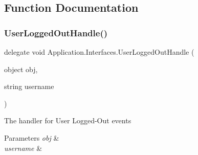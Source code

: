 \subsection{Function Documentation}
\mbox{\label{namespace_application_1_1_interfaces_a3ba96a057acca29f3e2e533aeb2f30e0}} 
\subsubsection{\texorpdfstring{User\+Logged\+Out\+Handle()}{UserLoggedOutHandle()}}
{\footnotesize\ttfamily delegate void Application.\+Interfaces.\+User\+Logged\+Out\+Handle (\begin{DoxyParamCaption}\item[{object}]{obj,  }\item[{string}]{username }\end{DoxyParamCaption})}



The handler for \textquotesingle{}User Logged-\/\+Out\textquotesingle{} events 


\begin{DoxyParams}{Parameters}
{\em obj} & \\
\hline
{\em username} & \\
\hline
\end{DoxyParams}
